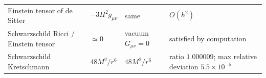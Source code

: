 \documentclass[aps,prd,amsmath,amssymb,superscriptaddress,longbibliography,floatfix,preprint]{revtex4-2}
\begin{document}
{\begin{longtable}{llll}
\arrayrulecolor{black!40}\hline\arrayrulecolor{black}
\parbox[c]{4.57cm}{\vspace{2.5pt}\raggedright {} Einstein tensor of de Sitter\vspace{2.5pt}} & \parbox[c]{2.82cm}{\vspace{2.5pt}\raggedright {} \mbox{$-3H^2 g_{\mu\nu}$}\vspace{2.5pt}} & \parbox[c]{2.25cm}{\vspace{2.5pt}\raggedright {} same\vspace{2.5pt}} & \parbox[c]{5.01cm}{\vspace{2.5pt}\raggedright {} \mbox{$O(h^2)$}\vspace{2.5pt}} \\
\hline{}
\parbox[c]{4.57cm}{\vspace{2.5pt}\raggedright {} Schwarzschild Ricci / Einstein tensor\vspace{2.5pt}} & \parbox[c]{2.82cm}{\vspace{2.5pt}\raggedright {} \mbox{$\simeq 0$}\vspace{2.5pt}} & \parbox[c]{2.25cm}{\vspace{2.5pt}\raggedright {} vacuum \mbox{$G_{\mu\nu} = 0$}\vspace{2.5pt}} & \parbox[c]{5.01cm}{\vspace{2.5pt}\raggedright {} satisfied by computation\vspace{2.5pt}} \\
\hline{}
\parbox[c]{4.57cm}{\vspace{2.5pt}\raggedright {} Schwarzschild Kretschmann\vspace{2.5pt}} & \parbox[c]{2.82cm}{\vspace{2.5pt}\raggedright {} \mbox{$48 M^2/r^6$}\vspace{2.5pt}} & \parbox[c]{2.25cm}{\vspace{2.5pt}\raggedright {} \mbox{$48 M^2/r^6$}\vspace{2.5pt}} & \parbox[c]{5.01cm}{\vspace{2.5pt}\raggedright {} ratio \mbox{$1.000009$}; max relative deviation \mbox{$5.5\times10^{-5}$}\vspace{2.5pt}} \\

\end{longtable}}
\end{document}
